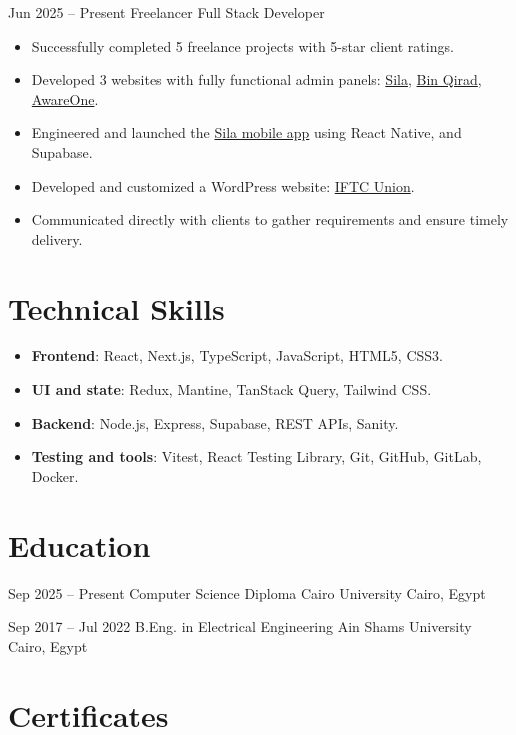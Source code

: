 \documentclass[11pt,a4paper,sans]{moderncv}
\begin{document}
\cventry
  {Jun 2025 – Present}
  {Freelancer}
  {Full Stack Developer}
  {}
  {}
  {\normalsize\begin{itemize}
    \setlength{\itemsep}{1.5pt}
    \item Successfully completed 5 freelance projects with 5-star client ratings. 
    \item Developed 3 websites with fully functional admin panels: \href{https://silaevent.com/}{Sila}, \href{https://binqirad-resume-demo.vercel.app/}{Bin Qirad}, \href{https://awareone.net}{AwareOne}.
    \item Engineered and launched the \href{https://apps.apple.com/sa/app/صلة-sila/id6788866397}{Sila mobile app} using React Native, and Supabase.
    \item Developed and customized a WordPress website: \href{https://iftcunion.org/}{IFTC Union}.
    \item Communicated directly with clients to gather requirements and ensure timely delivery. 
  \end{itemize}}

\section{Technical Skills}
\begin{itemize}
\setlength{\itemsep}{1.5pt}
\item \textbf{Frontend}: React, Next.js, TypeScript, JavaScript, HTML5, CSS3.
\item \textbf{UI and state}: Redux, Mantine, TanStack Query, Tailwind CSS.
\item \textbf{Backend}: Node.js, Express, Supabase, REST APIs, Sanity.
\item \textbf{Testing and tools}: Vitest, React Testing Library, Git, GitHub, GitLab, Docker.
\end{itemize}

\section{Education}

\cventry
  {Sep 2025 – Present}
  {Computer Science Diploma}
  {Cairo University}
  {Cairo, Egypt}
  {}
  {}

\vspace*{0.2cm}

\cventry
  {Sep 2017 – Jul 2022}
  {B.Eng. in Electrical Engineering}
  {Ain Shams University}
  {Cairo, Egypt}
  {}
  {}

\section{Certificates}
\end{document}
